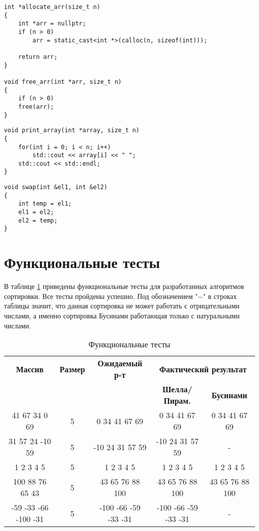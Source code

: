 \clearpage

\begin{lstlisting}[label=lst:allocate,caption=Функции выделение и освобождение памяти под массив]
int *allocate_arr(size_t n)
{
	int *arr = nullptr;
	if (n > 0)
		arr = static_cast<int *>(calloc(n, sizeof(int)));
	
	return arr;
}

void free_arr(int *arr, size_t n)
{
	if (n > 0)
	free(arr);
}
\end{lstlisting}

\begin{lstlisting}[label=lst:print,caption=Функция вывода print\_arr]
void print_array(int *array, size_t n)
{
	for(int i = 0; i < n; i++)
		std::cout << array[i] << " ";
	std::cout << std::endl;
}
\end{lstlisting}

\begin{lstlisting}[label=lst:swap,caption=Функция перестановки элементов места swap]
void swap(int &el1, int &el2)
{
	int temp = el1;
	el1 = el2;
	el2 = temp;
}
\end{lstlisting}

\clearpage

\section{Функциональные тесты}

В таблице \ref{tbl:func_tests} приведены функциональные тесты для разработанных алгоритмов сортировки. Все тесты пройдены успешно.
Под обозначением "$-$" \newline в строках таблицы значит, что данная сортировка не может работать с отрицательными числами, а именно сортировка Бусинами работающая только с натуральными числами.

\begin{table}[ht]
	\small
	\begin{center}
		\begin{threeparttable}
		\caption{Функциональные тесты}
		\label{tbl:func_tests}
		\begin{tabular}{|c|c|c|c|c|}
			\hline
			\bfseries Массив
			& \bfseries Размер
			& \bfseries Ожидаемый р-т
			& \multicolumn{2}{c|}{\bfseries Фактический результат} \\ \cline{4-5}
			& & & \bfseries Шелла/Пирам. & \bfseries Бусинами \\
			\hline
			41 67 34 0 69 & 5 & 0 34 41 67 69 & 0 34 41 67 69 & 0 34 41 67 69 \\
			\hline
			31 57 24 -10 59 & 5 & -10 24 31 57 59 & -10 24 31 57 59 & - \\
			\hline
			1 2 3 4 5 & 5 & 1 2 3 4 5 & 1 2 3 4 5 & 1 2 3 4 5 \\
			\hline
			100 88 76 65 43 & 5 & 43 65 76 88 100 & 43 65 76 88 100 & 43 65 76 88 100 \\
			\hline
			-59 -33 -66 -100 -31 & 5 & -100 -66 -59 -33 -31 & -100 -66 -59 -33 -31 & - \\
			\hline
		\end{tabular}	
		\end{threeparttable}	
	\end{center}
\end{table}


